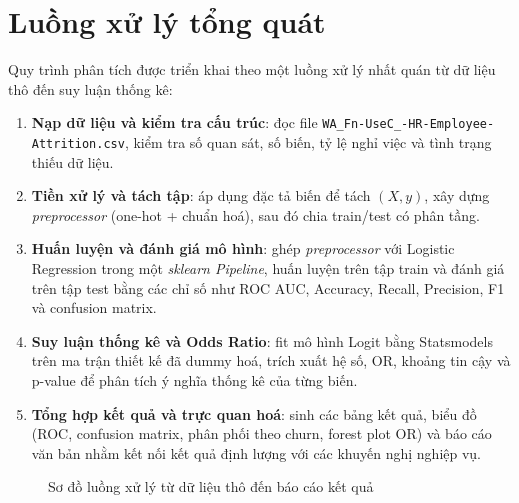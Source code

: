 \section{Luồng xử lý tổng quát}
Quy trình phân tích được triển khai theo một luồng xử lý nhất quán từ dữ liệu thô đến suy luận thống kê:
\begin{enumerate}
  \item \textbf{Nạp dữ liệu và kiểm tra cấu trúc}: đọc file \texttt{WA\_Fn-UseC\_-HR-Employee-Attrition.csv}, kiểm tra số quan sát, số biến, tỷ lệ nghỉ việc và tình trạng thiếu dữ liệu.
  \item \textbf{Tiền xử lý và tách tập}: áp dụng đặc tả biến để tách \((X, y)\), xây dựng \textit{preprocessor} (one-hot + chuẩn hoá), sau đó chia train/test có phân tầng.
  \item \textbf{Huấn luyện và đánh giá mô hình}: ghép \textit{preprocessor} với Logistic Regression trong một \textit{sklearn Pipeline}, huấn luyện trên tập train và đánh giá trên tập test bằng các chỉ số như ROC AUC, Accuracy, Recall, Precision, F1 và confusion matrix.
  \item \textbf{Suy luận thống kê và Odds Ratio}: fit mô hình Logit bằng Statsmodels trên ma trận thiết kế đã dummy hoá, trích xuất hệ số, OR, khoảng tin cậy và p-value để phân tích ý nghĩa thống kê của từng biến.
  \item \textbf{Tổng hợp kết quả và trực quan hoá}: sinh các bảng kết quả, biểu đồ (ROC, confusion matrix, phân phối theo churn, forest plot OR) và báo cáo văn bản nhằm kết nối kết quả định lượng với các khuyến nghị nghiệp vụ.
\end{enumerate}

\begin{figure}[H]
  \centering
  \caption{Sơ đồ luồng xử lý từ dữ liệu thô đến báo cáo kết quả}
\end{figure}


